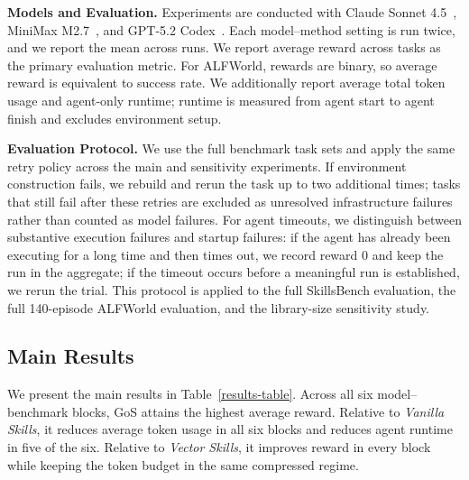 \noindent\textbf{Models and Evaluation.}
Experiments are conducted with Claude Sonnet 4.5~\citep{anthropic2025claude45}, MiniMax M2.7~\citep{minimax2026m27}, and GPT-5.2 Codex~\citep{openai2025gpt52codex}.
%
Each model--method setting is run twice, and we report the mean across runs. We report average reward across tasks as the primary evaluation metric. For ALFWorld, rewards are binary, so average reward is equivalent to success rate. We additionally report average total token usage and agent-only runtime; runtime is measured from agent start to agent finish and excludes environment setup.


\noindent\textbf{Evaluation Protocol.}
We use the full benchmark task sets and apply the same retry policy across the main and sensitivity experiments. If environment construction fails, we rebuild and rerun the task up to two additional times; tasks that still fail after these retries are excluded as unresolved infrastructure failures rather than counted as model failures. For agent timeouts, we distinguish between substantive execution failures and startup failures: if the agent has already been executing for a long time and then times out, we record reward $0$ and keep the run in the aggregate; if the timeout occurs before a meaningful run is established, we rerun the trial. This protocol is applied to the full SkillsBench evaluation, the full 140-episode ALFWorld evaluation, and the library-size sensitivity study.


\subsection{Main Results}

We present the main results in Table~\ref{results-table}.
%
Across all six model--benchmark blocks, GoS attains the highest average reward. Relative to \textit{Vanilla Skills}, it reduces average token usage in all six blocks and reduces agent runtime in five of the six. Relative to \textit{Vector Skills}, it improves reward in every block while keeping the token budget in the same compressed regime.




